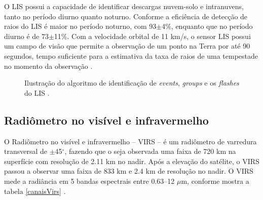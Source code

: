      
O LIS possui a capacidade de identificar descargas nuvem-solo e intranuvens, tanto no período diurno quanto noturno. Conforme  a eficiência de detecção de raios do LIS é maior no período noturno, com 93$\pm$4\%, enquanto que no período diurno é de 73$\pm$11\%.  Com a velocidade orbital de 11 km/s, o sensor LIS possui um campo de visão que permite a observação de um ponto na Terra por até 90 segundos, tempo suficiente para a estimativa da taxa de raios de uma tempestade no momento da observação \cite{christianTM,trmmhandbook}.

\begin{figure}[!ht]
\caption{Ilustração do algoritmo de identificação de \textit{events}, \textit{groups} e os \textit{flashes}  do LIS \cite{christian2000LISalgorithm}.}
\label{LisImagemProcessa} 
\end{figure} 


\subsection{Radiômetro no visível e infravermelho}

O Radiômetro no visível e infravermelho -- VIRS -- é um radiômetro de varredura transversal de $\pm$45$^{\circ}$, fazendo que o seja observada uma faixa de 720 km  na superfície com resolução de 2.11 km no nadir. Após a elevação do satélite, o VIRS passou a observar uma faixa de 833 km e 2.4 km de resolução no nadir. O VIRS mede a radiância em 5 bandas espectrais entre 0.63--12 $\mu$m, conforme mostra a tabela \ref{canaisVirs} \cite{kummerok1998}.

